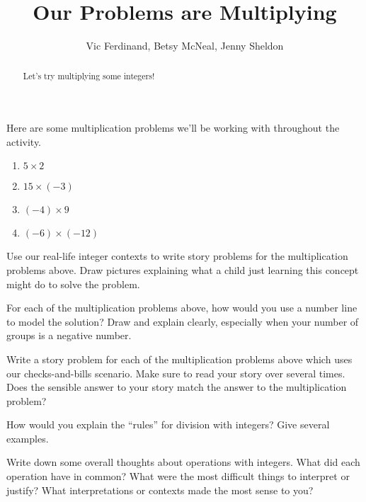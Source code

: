 \documentclass[nooutcomes]{ximera}
\title{Our Problems are Multiplying}
\author{Vic Ferdinand, Betsy McNeal, Jenny Sheldon}
\begin{document}
\begin{abstract}
    Let's try multiplying some integers!
\end{abstract}
\maketitle



Here are some multiplication problems we'll be working with throughout the activity.

\begin{enumerate}
    \item $5 \times 2$
    \item $15 \times (-3)$
    \item $(-4) \times 9$
    \item $(-6) \times (-12)$
\end{enumerate}


\begin{problem}
Use our real-life integer contexts to write story problems for the multiplication problems above.  Draw pictures explaining what a child just learning this concept might do to solve the problem.

\end{problem}

\begin{problem}
For each of the multiplication problems above, how would you use a number line to model the solution?  Draw and explain clearly, especially when your number of groups is a negative number.
\end{problem}

\begin{problem}
Write a story problem for each of the multiplication problems above which uses our checks-and-bills scenario.  Make sure to read your story over several times.  Does the sensible answer to your story match the answer to the multiplication problem?
\end{problem}

\begin{problem}
How would you explain the ``rules'' for division with integers?  Give several examples.


\end{problem}


\begin{problem}
Write down some overall thoughts about operations with integers.  What did each operation have in common?  What were the most difficult things to interpret or justify?  What interpretations or contexts made the most sense to you?


\end{problem}
\end{document}
